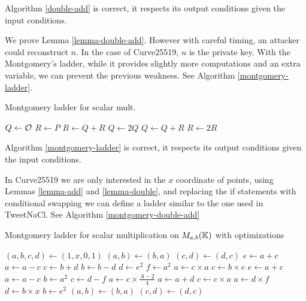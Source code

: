 \begin{lemma}
\label{lemma-double-add}
Algorithm \ref{double-add} is correct, \ie it respects its output conditions given the input conditions.
\end{lemma}

We prove Lemma \ref{lemma-double-add}. However with careful timing, an attacker could reconstruct $n$.
In the case of Curve25519, $n$ is the private key. With the Montgomery's ladder, while it provides slightly more computations and an extra variable, we can prevent the previous weakness.
See Algorithm \ref{montgomery-ladder}.

\begin{algorithm}
\caption{Montgomery ladder for scalar mult.}
\label{montgomery-ladder}
\begin{algorithmic}
\STATE $Q \leftarrow \mathcal{O}$
\STATE $R \leftarrow P$
    \STATE $R \leftarrow Q + R$
    \STATE $Q \leftarrow 2Q$
  \ELSE
    \STATE $Q \leftarrow Q + R$
    \STATE $R \leftarrow 2R$
  \ENDIF
\ENDFOR
\end{algorithmic}
\end{algorithm}

\begin{lemma}
\label{lemma-montgomery-ladder}
Algorithm \ref{montgomery-ladder} is correct, \ie it respects its output conditions given the input conditions.
\end{lemma}

In Curve25519 we are only interested in the $x$ coordinate of points, using Lemmas \ref{lemma-add} and \ref{lemma-double}, and replacing the if statements with conditional swapping we can define a ladder similar to the one used in TweetNaCl. See Algorithm \ref{montgomery-double-add}

\begin{algorithm}
\caption{Montgomery ladder for scalar multiplication on $M_{a,b}(\mathbb{K})$ with optimizations}
\label{montgomery-double-add}
\begin{algorithmic}
\STATE $(a,b,c,d) \leftarrow (1,x,0,1)$
    \STATE $(a,b) \leftarrow (b,a)$
    \STATE $(c,d) \leftarrow (d,c)$
  \ENDIF
  \STATE $e \leftarrow a + c$
  \STATE $a \leftarrow a - c$
  \STATE $c \leftarrow b + d$
  \STATE $b \leftarrow b - d$
  \STATE $d \leftarrow e^2$
  \STATE $f \leftarrow a^2$
  \STATE $a \leftarrow c \times a$
  \STATE $c \leftarrow b \times e$
  \STATE $e \leftarrow a + c$
  \STATE $a \leftarrow a - c$
  \STATE $b \leftarrow a^2$
  \STATE $c \leftarrow d-f$
  \STATE $a \leftarrow c\times\frac{A - 2}{4}$
  \STATE $a \leftarrow a + d$
  \STATE $c \leftarrow c \times a$
  \STATE $a \leftarrow d \times f$
  \STATE $d \leftarrow b \times x$
  \STATE $b \leftarrow e^2$
    \STATE $(a,b) \leftarrow (b,a)$
    \STATE $(c,d) \leftarrow (d,c)$
  \ENDIF
\ENDFOR
\end{algorithmic}
\end{algorithm}

